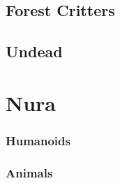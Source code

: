 \documentclass[a4paper,openany]{book}
\begin{document}
\section{Forest Critters}

\begin{multicols}{2}

\bear

\boar

\chitincrawler

\basilisk

\wolf

\woodspy

\end{multicols}

\section{Undead}

\begin{multicols}{2}

\ghoul

\ghast

\demilich

\lich

\end{multicols}

\chapter{Nura}

\begin{multicols}{2}

\subsection{Humanoids}


\goblin

\goblin

\goblinnuramancer

\hobgoblin

\ogre

\deepogre

\subsection{Animals}

\nurarat

\nurahorse

\nuracrab

\nuracat

\nuraslug

\nuraspider

\nurawolf

\end{multicols}
\end{document}
